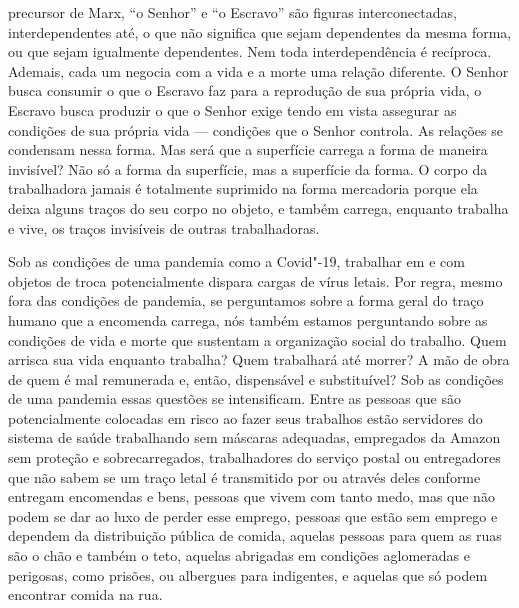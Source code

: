 \begin{multicols}{2}

{}

\bigskip

\noindent{}precursor de Marx, ``o Senhor'' e ``o
Escravo'' são figuras interconectadas, interdependentes até, o que não
significa que sejam dependentes da mesma forma, ou que sejam igualmente
dependentes. Nem toda interdependência é recíproca. Ademais, cada um
negocia com a vida e a morte uma relação diferente. O Senhor busca
consumir o que o Escravo faz para a reprodução de sua própria vida, o
Escravo busca produzir o que o Senhor exige tendo em vista assegurar as
condições de sua própria vida --- condições que o Senhor controla. As
relações se condensam nessa forma. Mas será que a superfície carrega a
forma de maneira invisível? Não só a forma da superfície, mas a
superfície da forma. O corpo da trabalhadora jamais é totalmente
suprimido na forma mercadoria porque ela deixa alguns traços do seu
corpo no objeto, e também carrega, enquanto trabalha e vive, os traços
invisíveis de outras trabalhadoras.

Sob as condições de uma pandemia como a Covid"-19, trabalhar em e com
objetos de troca potencialmente dispara cargas de vírus letais. Por
regra, mesmo fora das condições de pandemia, se perguntamos sobre a
forma geral do traço humano que a encomenda carrega, nós também estamos
perguntando sobre as condições de vida e morte que sustentam a
organização social do trabalho. Quem arrisca sua vida enquanto trabalha?
Quem trabalhará até morrer? A mão de obra de quem é mal remunerada e,
então, dispensável e substituível? Sob as condições de uma pandemia
essas questões se intensificam. Entre as pessoas que são potencialmente
colocadas em risco ao fazer seus trabalhos estão servidores do sistema
de saúde trabalhando sem máscaras adequadas, empregados da Amazon sem
proteção e sobrecarregados, trabalhadores do serviço postal ou
entregadores {} que não sabem se um traço letal é
transmitido por ou através deles conforme entregam encomendas e bens,
pessoas que vivem com tanto medo, mas que não podem se dar ao luxo de
perder esse emprego, pessoas que estão sem emprego e dependem da
distribuição pública de comida, aquelas pessoas para quem as ruas são o
chão e também o teto, aquelas abrigadas em condições aglomeradas e
perigosas, como prisões, ou albergues para indigentes, e aquelas que só
podem encontrar comida na rua.


\end{multicols}
